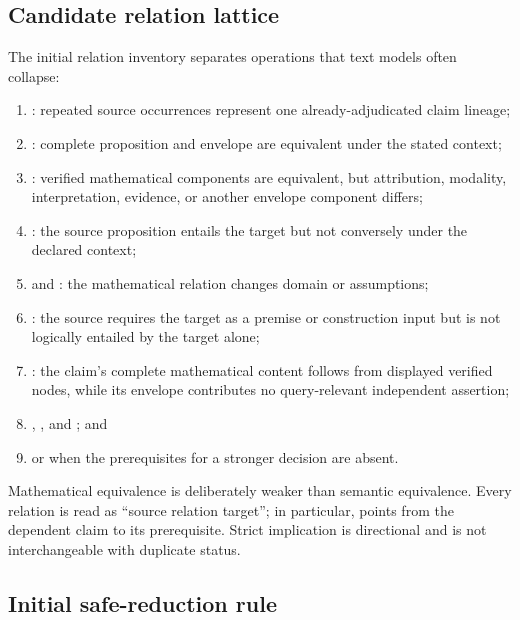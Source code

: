 \subsection{Candidate relation lattice}

The initial relation inventory separates operations that text models often collapse:
\begin{enumerate}
  \item {}: repeated source occurrences represent one already-adjudicated claim lineage;
  \item {}: complete proposition and envelope are equivalent under the stated context;
  \item {}: verified mathematical components are equivalent, but attribution, modality, interpretation, evidence, or another envelope component differs;
  \item {}: the source proposition entails the target but not conversely under the declared context;
  \item {} and : the mathematical relation changes domain or assumptions;
  \item {}: the source requires the target as a premise or construction input but is not logically entailed by the target alone;
  \item {}: the claim's complete mathematical content follows from displayed verified nodes, while its envelope contributes no query-relevant independent assertion;
  \item {}, , and ; and
  \item {} or  when the prerequisites for a stronger decision are absent.
\end{enumerate}
Mathematical equivalence is deliberately weaker than semantic equivalence. Every relation is read as ``source relation target''; in particular,  points from the dependent claim to its prerequisite. Strict implication is directional and is not interchangeable with duplicate status.

\subsection{Initial safe-reduction rule}

